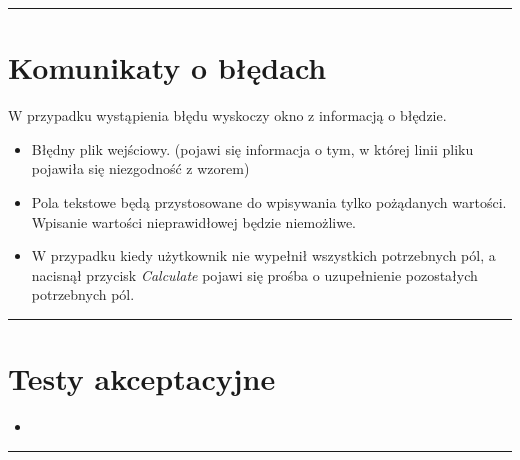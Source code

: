 \documentclass[a4paper,11pt]{article}
\newcommand{\linia}{\rule{\linewidth}{0.4mm}}
\begin{document}
\noindent\linia
\section{Komunikaty o błędach}
W przypadku wystąpienia błędu wyskoczy okno z informacją o błędzie.
\begin{itemize}
\item Błędny plik wejściowy. (pojawi się informacja o tym, w której linii pliku pojawiła się niezgodność z wzorem)
\item Pola tekstowe będą przystosowane do wpisywania tylko pożądanych wartości. Wpisanie wartości nieprawidłowej będzie niemożliwe.
\item W przypadku kiedy użytkownik nie wypełnił wszystkich potrzebnych pól, a nacisnął przycisk \textit{Calculate} pojawi się prośba o uzupełnienie pozostałych potrzebnych pól.
\end{itemize}

\noindent\linia
\section{Testy akceptacyjne}

\begin{itemize}
\item 

\end{itemize}

\noindent\linia
\end{document}
